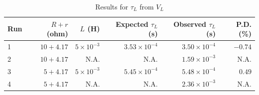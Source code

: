 %
\begin{table}[ht]
    \centering
    \begin{tabular}{|l|r|r|r|r|r|}
        \hline
        Run & $R + r$ (ohm) & $L$ (H) & Expected $\tau_{L}$ (s) & Observed $\tau_{L}$ (s) & P.D. (\%) \\
        \hline
        1 & $10 + 4.17$ & $5 \times 10^{-3}$ & $3.53 \times 10^{-4}$ & $3.50 \times 10^{-4}$ & $-0.74$ \\
        2 & $10 + 4.17$ & N.A. & N.A. & $1.59 \times 10^{-3}$ & N.A. \\
        3 & $5 + 4.17$ & $5 \times 10^{-3}$ & $5.45 \times 10^{-4}$ & $5.48 \times 10^{-4}$ & $0.49$ \\
        4 & $5 + 4.17$ & N.A. & N.A. & $2.36 \times 10^{-3}$ & N.A. \\
        \hline
    \end{tabular}
    \caption{Results for $\tau_{L}$ from $V_{L}$}
    \label{table.05.results.tauL.VL}
\end{table}
%
\newpage
